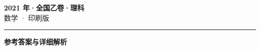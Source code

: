 \documentclass[zihao=5, a4paper]{ctexart}
\begin{document}
\begin{center}
  {\Large\bfseries 2021 年·全国乙卷·理科}\\[4pt]
  {\large 数学 · 印刷版}
\end{center}
\medskip
{}

\par\bigskip\hrule\bigskip
{}
\begin{center}{\large\bfseries 参考答案与详细解析}\end{center}
\smallskip

\end{document}
